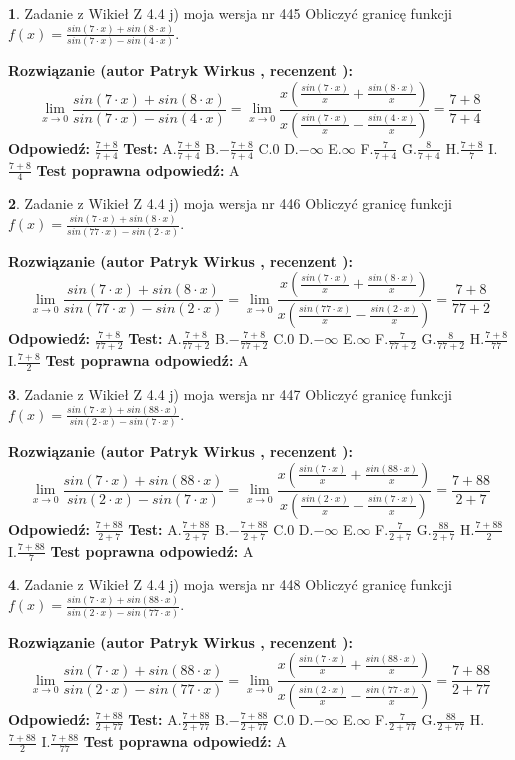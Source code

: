 \documentclass[12pt, a4paper]{article}
\theoremstyle{definition} %
\newtheorem{zad}{}
\newcommand{\zadStart}[1]{\begin{zad}#1\newline}
\newcommand{\zadStop}{\end{zad}}
\newcommand{\rozwStart}[2]{\noindent \textbf{Rozwiązanie (autor #1 , recenzent #2): }\newline}
\newcommand{\rozwStop}{\newline}
\newcommand{\odpStart}{\noindent \textbf{Odpowiedź:}\newline}
\newcommand{\odpStop}{\newline}
\newcommand{\testStart}{\noindent \textbf{Test:}\newline}
\newcommand{\testStop}{\newline}
\newcommand{\kluczStart}{\noindent \textbf{Test poprawna odpowiedź:}\newline}
\newcommand{\kluczStop}{\newline}
\begin{document}
\zadStart{Zadanie z Wikieł Z 4.4 j) moja wersja nr 445}
Obliczyć granicę funkcji $f(x)=\frac{sin(7\cdot x) +sin(8\cdot x)}{sin(7\cdot x) -sin(4\cdot x)}$.
\zadStop
\rozwStart{Patryk Wirkus}{}
$$\lim\limits_{x\to 0}\frac{sin(7\cdot x) +sin(8\cdot x)}{sin(7\cdot x) -sin(4\cdot x)}=\lim\limits_{x\to 0}\frac{x(\frac{sin(7\cdot x)}{x}+\frac{sin(8\cdot x)}{x})}{x(\frac{sin(7\cdot x)}{x}-\frac{sin(4\cdot x)}{x})}=\frac{7+8}{7+4}$$
\rozwStop
\odpStart
$\frac{7+8}{7+4}$
\odpStop
\testStart
A.$\frac{7+8}{7+4}$
B.$-\frac{7+8}{7+4}$
C.$0$
D.$-\infty$
E.$\infty$
F.$\frac{7}{7+4}$
G.$\frac{8}{7+4}$
H.$\frac{7+8}{7}$
I.$\frac{7+8}{4}$
\testStop
\kluczStart
A
\kluczStop



\zadStart{Zadanie z Wikieł Z 4.4 j) moja wersja nr 446}
Obliczyć granicę funkcji $f(x)=\frac{sin(7\cdot x) +sin(8\cdot x)}{sin(77\cdot x) -sin(2\cdot x)}$.
\zadStop
\rozwStart{Patryk Wirkus}{}
$$\lim\limits_{x\to 0}\frac{sin(7\cdot x) +sin(8\cdot x)}{sin(77\cdot x) -sin(2\cdot x)}=\lim\limits_{x\to 0}\frac{x(\frac{sin(7\cdot x)}{x}+\frac{sin(8\cdot x)}{x})}{x(\frac{sin(77\cdot x)}{x}-\frac{sin(2\cdot x)}{x})}=\frac{7+8}{77+2}$$
\rozwStop
\odpStart
$\frac{7+8}{77+2}$
\odpStop
\testStart
A.$\frac{7+8}{77+2}$
B.$-\frac{7+8}{77+2}$
C.$0$
D.$-\infty$
E.$\infty$
F.$\frac{7}{77+2}$
G.$\frac{8}{77+2}$
H.$\frac{7+8}{77}$
I.$\frac{7+8}{2}$
\testStop
\kluczStart
A
\kluczStop



\zadStart{Zadanie z Wikieł Z 4.4 j) moja wersja nr 447}
Obliczyć granicę funkcji $f(x)=\frac{sin(7\cdot x) +sin(88\cdot x)}{sin(2\cdot x) -sin(7\cdot x)}$.
\zadStop
\rozwStart{Patryk Wirkus}{}
$$\lim\limits_{x\to 0}\frac{sin(7\cdot x) +sin(88\cdot x)}{sin(2\cdot x) -sin(7\cdot x)}=\lim\limits_{x\to 0}\frac{x(\frac{sin(7\cdot x)}{x}+\frac{sin(88\cdot x)}{x})}{x(\frac{sin(2\cdot x)}{x}-\frac{sin(7\cdot x)}{x})}=\frac{7+88}{2+7}$$
\rozwStop
\odpStart
$\frac{7+88}{2+7}$
\odpStop
\testStart
A.$\frac{7+88}{2+7}$
B.$-\frac{7+88}{2+7}$
C.$0$
D.$-\infty$
E.$\infty$
F.$\frac{7}{2+7}$
G.$\frac{88}{2+7}$
H.$\frac{7+88}{2}$
I.$\frac{7+88}{7}$
\testStop
\kluczStart
A
\kluczStop



\zadStart{Zadanie z Wikieł Z 4.4 j) moja wersja nr 448}
Obliczyć granicę funkcji $f(x)=\frac{sin(7\cdot x) +sin(88\cdot x)}{sin(2\cdot x) -sin(77\cdot x)}$.
\zadStop
\rozwStart{Patryk Wirkus}{}
$$\lim\limits_{x\to 0}\frac{sin(7\cdot x) +sin(88\cdot x)}{sin(2\cdot x) -sin(77\cdot x)}=\lim\limits_{x\to 0}\frac{x(\frac{sin(7\cdot x)}{x}+\frac{sin(88\cdot x)}{x})}{x(\frac{sin(2\cdot x)}{x}-\frac{sin(77\cdot x)}{x})}=\frac{7+88}{2+77}$$
\rozwStop
\odpStart
$\frac{7+88}{2+77}$
\odpStop
\testStart
A.$\frac{7+88}{2+77}$
B.$-\frac{7+88}{2+77}$
C.$0$
D.$-\infty$
E.$\infty$
F.$\frac{7}{2+77}$
G.$\frac{88}{2+77}$
H.$\frac{7+88}{2}$
I.$\frac{7+88}{77}$
\testStop
\kluczStart
A
\kluczStop
\end{document}
